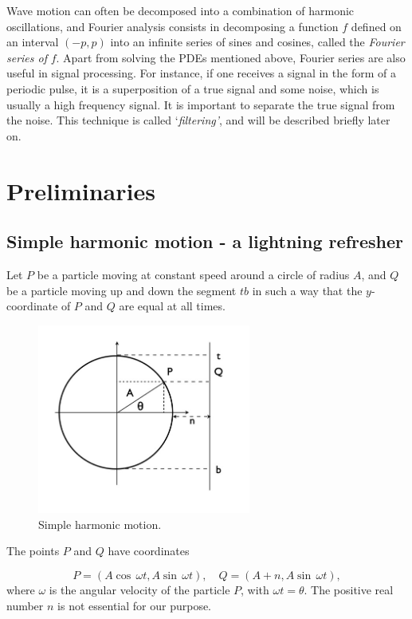 \documentclass[12pt]{article}
\numberwithin{equation}{section}
\begin{document}
Wave motion can often be decomposed into a combination of harmonic oscillations, and Fourier analysis consists in decomposing a function $f$ defined on an interval $(-p,p)$ into an infinite series of sines and cosines, called the {\em Fourier series of} $f$. Apart from solving the PDEs mentioned above, Fourier series are also useful in signal processing. For instance, if one receives a signal in the form of a periodic pulse, it is a superposition of a true signal and some noise, which is usually a high frequency signal. It is important to separate the true signal from the noise. This technique is called `{\em filtering'}, and will be described briefly later on.


\section{Preliminaries}
\subsection{Simple harmonic motion - a lightning refresher}
Let $P$ be a particle moving at constant speed around a circle of radius $A$, and $Q$ be a particle moving up and down the segment $tb$ in such a way that the $y$-coordinate of $P$ and $Q$ are equal at all times. %
\begin{figure}[H]
\begin{center}
\includegraphics[width=7cm,keepaspectratio]{Figs/harmonic.jpg}
\end{center}
\caption{\small Simple harmonic motion.}
\label{fig:SHM}
\end{figure}
The points $P$ and $Q$ have coordinates

\[
P=(A\cos\,\omega t, A\sin\,\omega t),\quad Q=(A+n,A\sin\,\omega t),
\]
where $\omega$ is the angular velocity of the particle $P$, with $\omega t=\theta$. The positive real number $n$ is not essential for our purpose.
\end{document}
